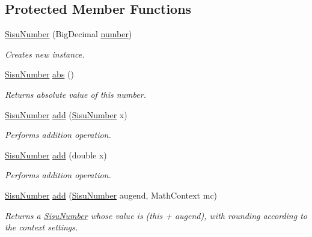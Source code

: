 \subsection*{Protected Member Functions}
\begin{DoxyCompactItemize}
\item 
\hyperlink{classcom_1_1aarrelaakso_1_1drawl_1_1_sisu_number_a25f10e2bda168baeb6695b8b7f4ac883}{Sisu\+Number} (Big\+Decimal \hyperlink{classcom_1_1aarrelaakso_1_1drawl_1_1_sisu_number_a5741c4131458787e3adb0bfe649d7758}{number})
\begin{DoxyCompactList}\small\item\em Creates new instance. \end{DoxyCompactList}\item 
\hyperlink{classcom_1_1aarrelaakso_1_1drawl_1_1_sisu_number}{Sisu\+Number} \hyperlink{classcom_1_1aarrelaakso_1_1drawl_1_1_sisu_number_ab0fbcc012471bbf5dc73166c9e27c66c}{abs} ()
\begin{DoxyCompactList}\small\item\em Returns absolute value of this number. \end{DoxyCompactList}\item 
\hyperlink{classcom_1_1aarrelaakso_1_1drawl_1_1_sisu_number}{Sisu\+Number} \hyperlink{classcom_1_1aarrelaakso_1_1drawl_1_1_sisu_number_a1fa1d8acecf29ce5184e0b59a6958166}{add} (\hyperlink{classcom_1_1aarrelaakso_1_1drawl_1_1_sisu_number}{Sisu\+Number} x)
\begin{DoxyCompactList}\small\item\em Performs addition operation. \end{DoxyCompactList}\item 
\hyperlink{classcom_1_1aarrelaakso_1_1drawl_1_1_sisu_number}{Sisu\+Number} \hyperlink{classcom_1_1aarrelaakso_1_1drawl_1_1_sisu_number_a427b0e1c60f6dbc58b9fc9f04c3602bb}{add} (double x)
\begin{DoxyCompactList}\small\item\em Performs addition operation. \end{DoxyCompactList}\item 
\hyperlink{classcom_1_1aarrelaakso_1_1drawl_1_1_sisu_number}{Sisu\+Number} \hyperlink{classcom_1_1aarrelaakso_1_1drawl_1_1_sisu_number_a13cecfd15fdc5ed59de2cd0edc3fe493}{add} (\hyperlink{classcom_1_1aarrelaakso_1_1drawl_1_1_sisu_number}{Sisu\+Number} augend, Math\+Context mc)
\begin{DoxyCompactList}\small\item\em Returns a \hyperlink{classcom_1_1aarrelaakso_1_1drawl_1_1_sisu_number}{Sisu\+Number} whose value is (this + augend), with rounding according to the context settings. \end{DoxyCompactList}\item 

\end{DoxyCompactItemize}

